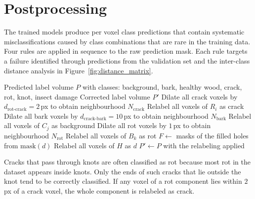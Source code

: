 \section{Postprocessing}

The trained models produce per voxel class predictions that contain systematic misclassifications caused by class combinations that are rare in the training data. Four rules are applied in sequence to the raw prediction mask. Each rule targets a failure identified through predictions from the validation set and the inter-class distance analysis in Figure~\ref{fig:distance_matrix}.

\begin{algorithm}[H]
\caption{Rule-based postprocessing of a predicted 3D label volume}
\label{alg:postprocess}
\begin{algorithmic}[1]
\Require Predicted label volume $P$ with classes: background, bark, healthy wood, crack, rot, knot, insect damage
\Ensure Corrected label volume $P'$
\State Dilate all crack voxels by $d_\text{rot-crack} = 2$\,px to obtain neighbourhood $N_\text{crack}$
    \State Relabel all voxels of $R_i$ as crack
  \EndIf
\EndFor
\State Dilate all bark voxels by $d_\text{crack-bark} = 10$\,px to obtain neighbourhood $N_\text{bark}$
    \State Relabel all voxels of $C_j$ as background
  \EndIf
\EndFor
\State Dilate all rot voxels by $1$\,px to obtain neighbourhood $N_\text{rot}$
    \State Relabel all voxels of $B_k$ as rot
  \EndIf
\EndFor
{}
  \State $F \gets$ masks of the filled holes from $\text{mask}(d)$ 
    \State Relabel all voxels of $H$ as $d$
\EndFor
\EndFor
\State $P' \gets P$ with the relabeling applied
\end{algorithmic}
\end{algorithm}

Cracks that pass through knots are often classified as rot because most rot in the dataset
appears inside knots.
Only the ends of such cracks that lie outside the knot tend to be correctly classified.
If any voxel of a rot component lies within $2$\,px of a crack voxel, the whole component is
relabeled as crack.

